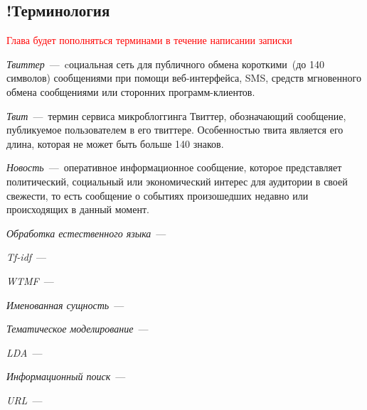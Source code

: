 \subsection{!Терминология}
    \textcolor{red}{Глава будет пополняться терминами в течение написании записки}

    \textit{Твиттер}~---~cоциальная сеть для публичного обмена короткими~(до 140 символов) сообщениями при помощи веб-интерфейса, SMS, средств мгновенного обмена сообщениями или сторонних программ-клиентов.

    \textit{Твит}~---~термин сервиса микроблоггинга Твиттер, обозначающий сообщение, публикуемое пользователем в его твиттере.
    Особенностью твита является его длина, которая не может быть больше 140 знаков.

    \textit{Новость}~---~оперативное информационное сообщение, которое представляет политический, социальный или экономический интерес для аудитории в своей свежести, то есть сообщение о событиях произошедших недавно или происходящих в данный момент.

    \textit{Обработка естественного языка}~---~

    \textit{Tf-idf}~---~

    \textit{WTMF}~---~

    \textit{Именованная сущность}~---~

    \textit{Тематическое моделирование}~---~

    \textit{LDA}~---~

    \textit{Информационный поиск}~---~

    \textit{URL}~---~

%
%
%
%
%


